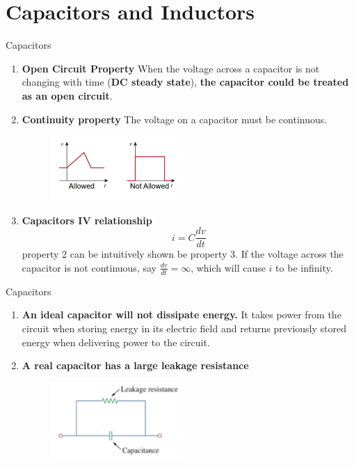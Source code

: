 \documentclass{beamer}
\begin{document}
    

\section{Capacitors and Inductors}


    \begin{frame}{Capacitors}
    \begin{enumerate}
        \item \textbf{Open Circuit Property} When the voltage across a capacitor is not changing with time (\textbf{DC steady state}), \textbf{the capacitor could be treated as an open circuit}.
        \item \textbf{Continuity property} The voltage on a capacitor must be continuous. 
        \begin{figure}
        \centering
        \includegraphics[width=2in]{ycy/Chap6/f1.jpg}
        \end{figure}
        \item \textbf{Capacitors IV relationship} 
        \begin{equation*}
            i=C\frac{dv}{dt}
        \end{equation*}
        property 2 can be intuitively shown be property 3. If the voltage across the capacitor is not continuous, say $\frac{dv}{dt}=\infty$, which will cause $i$ to be infinity.
    \end{enumerate}
    \end{frame}
    
    \begin{frame}{Capacitors}
    \begin{enumerate}
        \item \textbf{An ideal capacitor will not dissipate energy.} It takes power from the circuit when storing energy in its electric field and returns previously stored energy when delivering power to the circuit.
        \item \textbf{A real capacitor has a large leakage resistance} 
        \begin{figure}
        \centering
        \includegraphics[width=2in]{ycy/Chap6/f2.jpg}
        \end{figure}
    
    \end{enumerate}
    \end{frame}
    
\end{document}
